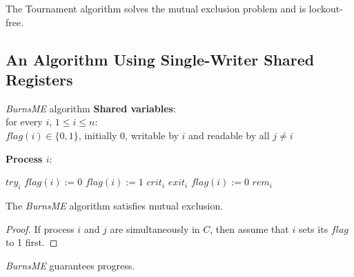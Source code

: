 \documentclass[11pt]{article}
\begin{document}
\begin{theorem}[]
The Tournament algorithm solves the mutual exclusion problem and is lockout-free.
\end{theorem}
\subsection{An Algorithm Using Single-Writer Shared Registers}
\label{sec:org393bf3b}
\begin{Block}{\textit{BurnsME} algorithm}
\noindent \textbf{Shared variables}:\\
\noindent for every \(i\), \(1\le i\le n\):\\
\indent \(flag(i)\in\{0,1\}\), initially 0, writable by \(i\) and readable by all \(j\neq i\)

\noindent \textbf{Process \(i\)}:\\
\begin{algorithm}[H]
\KwRem
\(try_i\)\;
\label{LLL}\(flag(i):=0\)\;
\(flag(i):=1\)\;
\label{MMM}
\(crit_i\)\;
\KwCrit
\(exit_i\)\;
\(flag(i):=0\)\;
\(rem_i\)\;
\end{algorithm}
\end{Block}

\begin{lemma}[]
The \emph{BurnsME} algorithm satisfies mutual exclusion.
\end{lemma}

\begin{proof}
If process \(i\) and \(j\) are simultaneously in \(C\), then assume that \(i\) sets its \(flag\) to 1
first. 
\end{proof}

\begin{lemma}[]
\emph{BurnsME} guarantees progress.
\end{lemma}
\end{document}
